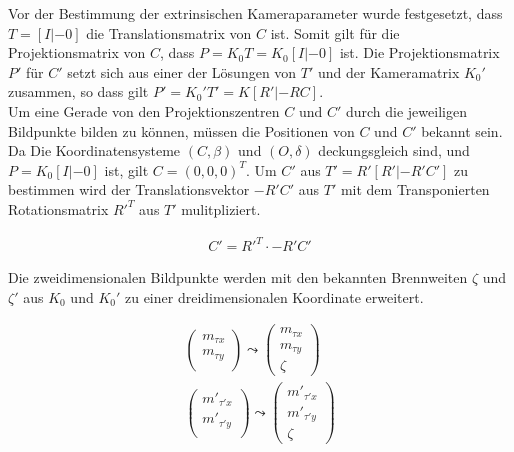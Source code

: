 

Vor der Bestimmung der extrinsischen Kameraparameter wurde festgesetzt, dass $T = [I|-0]$ die Translationsmatrix von $C$ ist. Somit gilt für die Projektionsmatrix von $C$, dass $P= K_0T =K_0[I|-0]$ ist. Die Projektionsmatrix $P'$ für $C'$ setzt sich aus einer der Lösungen von $T'$ und der Kameramatrix $K_0'$ zusammen, so dass gilt $P'=K_0'T' = K[R'|-RC]$.\\

Um eine Gerade von den Projektionszentren $C$ und $C'$ durch die jeweiligen Bildpunkte bilden zu können, müssen die Positionen von $C$ und $C'$ bekannt sein. Da Die Koordinatensysteme $(C,\beta)$ und $(O,\delta)$ deckungsgleich sind, und $P = K_0[I|-0]$ ist, gilt $C = (0,0,0)^T$.  Um $C'$ aus $T' = R'[R'|-R'C']$ zu bestimmen wird der Translationsvektor $-R'C'$ aus $T'$ mit dem Transponierten Rotationsmatrix $R'^T$ aus $T'$ mulitpliziert.

\begin{gather}
	C' =  R'^T \cdot -R'C' 
\end{gather}

%

Die zweidimensionalen Bildpunkte werden mit den bekannten Brennweiten $\zeta$ und $\zeta'$ aus $K_0$ und $K_0'$ zu einer dreidimensionalen Koordinate erweitert.

\begin{gather}
	\begin{pmatrix}
	m_{\tau x}\\
	m_{\tau y}\\
	\end{pmatrix} \leadsto 
		\begin{pmatrix}
	m_{\tau x} \\
	m_{\tau y}\\
	\zeta
	\end{pmatrix}\\
		\begin{pmatrix}
	m'_{\tau' x}\\
	m'_{\tau' y}\\
	\end{pmatrix} \leadsto 
	\begin{pmatrix}
	m'_{\tau' x} \\
	m'_{\tau' y}\\
	\zeta
	\end{pmatrix}	
\end{gather}

